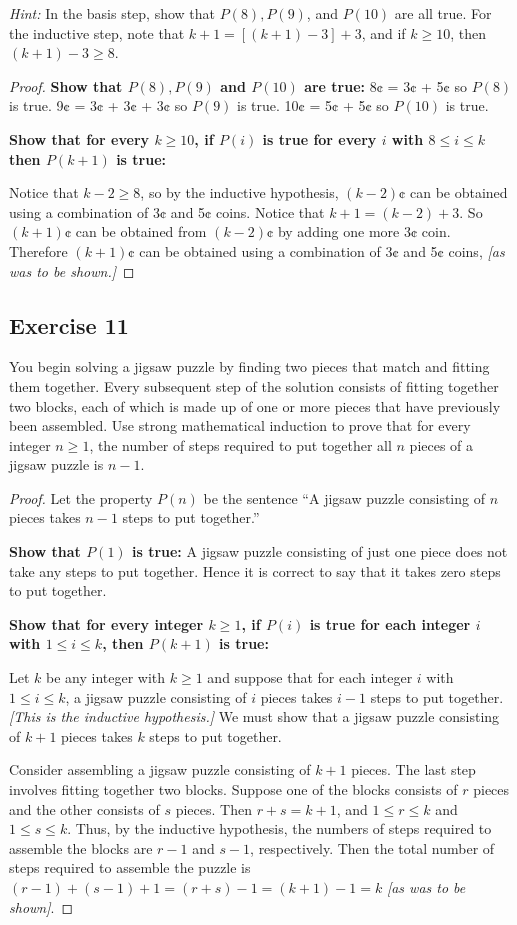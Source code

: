 \documentclass[14pt]{extarticle}
\begin{document}
{\it Hint:} In the basis step, show that $P(8), P(9)$,
and $P(10)$ are all true. For the inductive step, note
that $k + 1 = [(k + 1) - 3] + 3$, and if $k \geq 10$, then
$(k + 1) - 3 \geq 8$.

\begin{proof}
{\bf Show that $P(8), P(9)$ and $P(10)$ are true:}
8¢ = 3¢ + 5¢ so $P(8)$ is true. 
9¢ = 3¢ + 3¢ + 3¢ so $P(9)$ is true. 
10¢ = 5¢ + 5¢ so $P(10)$ is true.

{\bf Show that for every $k \geq 10$, if $P(i)$ is true for every $i$ with $8 \leq i \leq k$ then $P(k+1)$ is true:}

Notice that $k - 2 \geq 8$, so by the inductive hypothesis, $(k-2)$¢ can be obtained using a combination of 3¢ and 5¢ coins. 
Notice that $k + 1 = (k-2) + 3$. So $(k+1)$¢ can be obtained from $(k-2)$¢ by adding one more 3¢ coin.
Therefore $(k+1)$¢ can be obtained using a combination of 3¢ and 5¢ coins, {\it [as was to be shown.]}
\end{proof}

\subsection{Exercise 11}
You begin solving a jigsaw puzzle by finding two pieces that match and fitting them together. 
Every subsequent step of the solution consists of fitting together two blocks, each of which is made up of one or more pieces that have previously been assembled. 
Use strong mathematical induction to prove that for every integer $n \geq 1$, the number of steps required to put together all $n$ pieces of a jigsaw puzzle is $n - 1$.

\begin{proof}
Let the property $P(n)$ be the sentence ``A jigsaw puzzle consisting of $n$ pieces takes $n - 1$ steps to put together.''

{\bf Show that $P(1)$ is true:}
A jigsaw puzzle consisting of just one piece does not
take any steps to put together. Hence it is correct to say
that it takes zero steps to put together.

{\bf Show that for every integer $k \geq 1$, if $P(i)$ is true for each integer $i$ with $1 \leq i \leq k$, then $P(k + 1)$ is true:}

Let $k$ be any integer with $k \geq 1$ and suppose that for
each integer $i$ with $1 \leq i \leq k$, a jigsaw puzzle consisting of $i$ pieces takes $i - 1$ steps to put together. {\it [This is the inductive hypothesis.]} 
We must show that a jigsaw puzzle consisting of $k + 1$ pieces takes $k$ steps to put together. 

Consider assembling a jigsaw puzzle consisting of $k + 1$ pieces. 
The last step involves fitting together two blocks. Suppose one of the blocks consists of $r$ pieces and the other consists of $s$ pieces. Then $r + s = k + 1$, and $1 \leq r \leq k$ and $1 \leq s \leq k$. 
Thus, by the inductive hypothesis, the numbers of steps required to assemble the blocks are $r - 1$ and $s - 1$, respectively. 
Then the total number of steps required to assemble the puzzle is $(r - 1) + (s - 1) + 1 = (r + s) - 1 = (k + 1) - 1 = k$ {\it [as was to be shown]}.
\end{proof}
\end{document}
